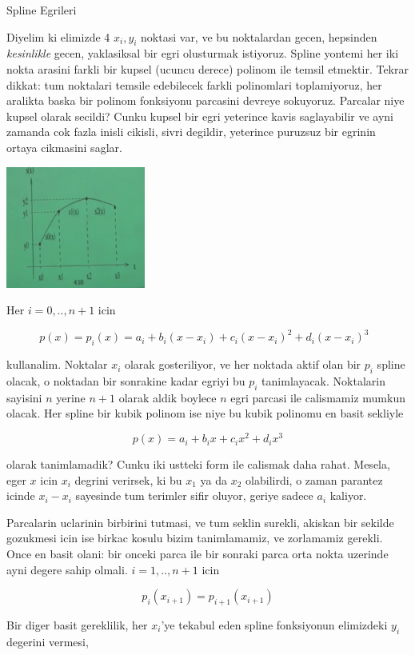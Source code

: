 \documentclass[12pt,fleqn]{article}\usepackage{common}
\begin{document}
Spline Egrileri

Diyelim ki elimizde 4 $x_i,y_i$ noktasi var, ve bu noktalardan gecen,
hepsinden {\em kesinlikle} gecen, yaklasiksal bir egri olusturmak
istiyoruz. Spline yontemi her iki nokta arasini farkli bir kupsel (ucuncu
derece) polinom ile temsil etmektir. Tekrar dikkat: tum noktalari temsile
edebilecek farkli polinomlari toplamiyoruz, her aralikta baska bir polinom
fonksiyonu parcasini devreye sokuyoruz. Parcalar niye kupsel olarak
secildi? Cunku kupsel bir egri yeterince kavis saglayabilir ve ayni zamanda
cok fazla inisli cikisli, sivri degildir, yeterince puruzsuz bir egrinin
ortaya cikmasini saglar.

\includegraphics[height=4cm]{spline1.png}

Her $i=0,..,n+1$ icin 

\[ p(x) = p_i(x) = a_i + b_i(x-x_i) + c_i(x-x_i)^2 + d_i(x-x_i)^3
\ \ \ \label{1}
\]

kullanalim. Noktalar $x_i$ olarak gosteriliyor, ve her noktada aktif olan
bir $p_i$ spline olacak, o noktadan bir sonrakine kadar egriyi bu $p_i$
tanimlayacak. Noktalarin sayisini $n$ yerine $n+1$ olarak aldik boylece $n$
egri parcasi ile calismamiz mumkun olacak. Her spline bir kubik polinom ise
niye bu kubik polinomu en basit sekliyle

\[ p(x) = a_i + b_ix + c_ix^2 + d_ix^3 \]

olarak tanimlamadik? Cunku iki ustteki form ile calismak daha
rahat. Mesela, eger $x$ icin $x_i$ degrini verirsek, ki bu $x_1$ ya da
$x_2$ olabilirdi, o zaman parantez icinde $x_i - x_i$ sayesinde tum terimler sifir
oluyor, geriye sadece $a_i$ kaliyor. 

Parcalarin uclarinin birbirini tutmasi, ve tum seklin surekli, akiskan bir
sekilde gozukmesi icin ise birkac kosulu bizim tanimlamamiz, ve zorlamamiz
gerekli. Once en basit olani: bir onceki parca ile bir sonraki parca
orta nokta uzerinde ayni degere sahip olmali. $i=1,..,n+1$ icin

\[ p_i (x_{i+1}) = p_{i+1}(x_{i+1}) \]

Bir diger basit gereklilik, her $x_i$'ye tekabul eden spline fonksiyonun
elimizdeki $y_i$ degerini vermesi,
\end{document}
